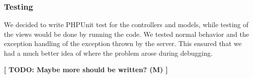 \subsubsection{Testing}
We decided to write PHPUnit test for the controllers and models, while testing of the views would be done by running the code. We tested normal behavior and the exception handling of the exception thrown by the server. This ensured that we had a much better idea of where the problem arose during debugging.

\textbf{[ TODO: Maybe more should be written? (M) ]}